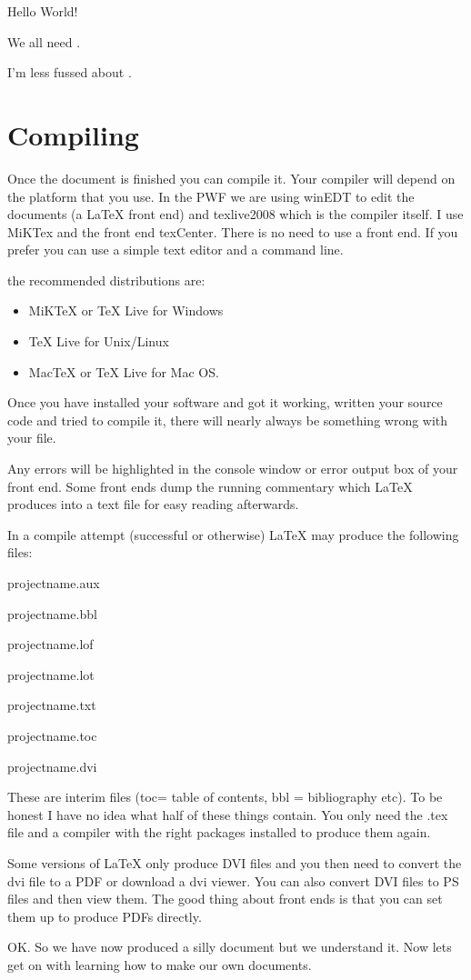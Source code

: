 \vspace{4ex}
Hello World!

We all need .

I'm less fussed about .

\pagebreak
\section{Compiling}
Once the document is finished you can compile it. Your compiler will depend on the platform that you use. In the PWF we are using winEDT to edit the documents (a LaTeX front end) and texlive2008 which is the compiler itself. I use MiKTex and the front end texCenter.  There is no need to use a front end. If you prefer you can use a simple text editor and a command line.

the recommended distributions are:
\begin{itemize}
\item MiKTeX or TeX Live for Windows
\item TeX Live for Unix/Linux
\item MacTeX or TeX Live for Mac OS.
\end{itemize}

Once you have installed your software and got it working, written your source code and tried to compile it, there will nearly always be something wrong with your file. 

Any errors will be highlighted in the console window or error output box of your front end.  Some front ends dump the running commentary which LaTeX produces into a text file for easy reading afterwards.

In a compile attempt (successful or otherwise) LaTeX may produce the following files:

projectname.aux

projectname.bbl

projectname.lof

projectname.lot

projectname.txt

projectname.toc

projectname.dvi

These are interim files (toc= table of contents, bbl = bibliography etc). To be honest I have no idea what half of these things contain.  You only need the .tex file and a compiler with the right packages installed to produce them again.

Some versions of LaTeX only produce DVI files and you then need to convert the dvi file to a PDF or download a dvi viewer. You can also convert DVI files to PS files and then view them.  The good thing about front ends is that you can set them up to produce PDFs directly.

OK. So we have now produced a silly document but we understand it.  Now lets get on with learning how to make our own documents.


